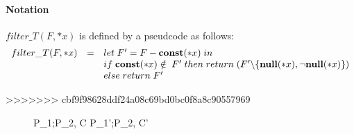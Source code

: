 \paragraph{Notation}
\(filter\_T(F, *x)\) is defined by a pseudcode as follows:
\[
\begin{array}{lcl}
  filter\_T(F, *x) &=& let \; F' = F - \mathbf{const}(*x) \; in \\
  & & if \; \mathbf{const}(*x) \notin \; F'\; then \; return \; (F' \backslash \{{\bf null}(*x),\neg{\bf null}(*x)\})\\
  & & else \; return \; F'
\end{array}
\]

>>>>>>> cbf9f98628ddf24a08c69bd0bc0f8a8c90557969
\begin{figure}
 \begin{minipage}{\textwidth}




\vspace{2mm}

\begin{minipage}{0.5\textwidth}
\end{minipage}
\begin{minipage}{0.5\textwidth}
 \end{minipage}

\vspace{2mm}      

\begin{minipage}{0.5\textwidth}
\end{minipage}
\begin{minipage}{0.5\textwidth}
\end{minipage}

{ \langle P_1;P_2, C \rangle \xlongrightarrow{\rho} \langle P_1';P_2, C' \rangle }


\end{minipage}
\end{figure}
